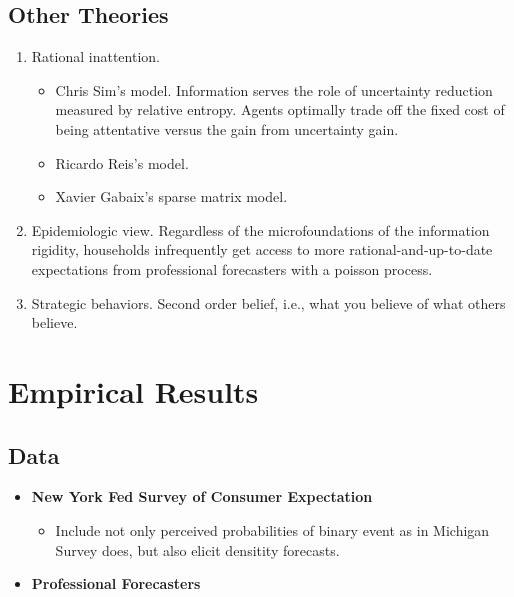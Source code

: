 \documentclass[]{article}
\begin{document}
\subsection{Other Theories}

\begin{enumerate}
\item Rational inattention. 
\begin{itemize}
	\item Chris Sim's model.\cite{sims2003implications} Information serves the role of uncertainty reduction measured by relative entropy. Agents optimally trade off the fixed cost of being attentative versus the gain from uncertainty gain.   
	\item Ricardo Reis's model. \cite{reis2006inattentive}
	\item Xavier Gabaix's sparse matrix model. \cite{gabaix2014sparsity}
\end{itemize}

\item Epidemiologic view. \cite{carroll2003macroeconomic} Regardless of the microfoundations of the information rigidity, households infrequently get access to more rational-and-up-to-date expectations from professional forecasters with a poisson process. 


\item Strategic behaviors. Second order belief, i.e., what you believe of what others believe. \cite{angeletos2009incomplete}



\end{enumerate}

\section{Empirical Results}

\subsection{Data}

\begin{itemize}
	
		\item \textbf{New York Fed Survey of Consumer Expectation}
	\begin{itemize}
			\item Include not only perceived probabilities of binary event as in Michigan Survey does, but also elicit densitity forecasts. 
	\end{itemize}
	\item \textbf{Professional Forecasters}

\end{itemize}
\end{document}
